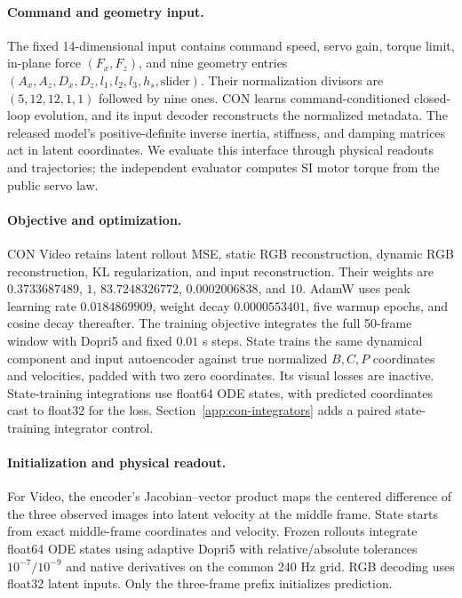 \paragraph{Command and geometry input.}
The fixed 14-dimensional input contains command speed, servo gain, torque limit, in-plane force $(F_x,F_z)$, and nine geometry entries $(A_x,A_z,D_x,D_z,l_1,l_2,l_3,h_s,\mathrm{slider})$. Their normalization divisors are $(5,12,12,1,1)$ followed by nine ones. CON learns command-conditioned closed-loop evolution, and its input decoder reconstructs the normalized metadata. The released model's positive-definite inverse inertia, stiffness, and damping matrices act in latent coordinates. We evaluate this interface through physical readouts and trajectories; the independent evaluator computes SI motor torque from the public servo law.

\paragraph{Objective and optimization.}
CON Video retains latent rollout MSE, static RGB reconstruction, dynamic RGB reconstruction, KL regularization, and input reconstruction. Their weights are $0.3733687489$, $1$, $83.7248326772$, $0.0002006838$, and $10$. AdamW uses peak learning rate $0.0184869909$, weight decay $0.0000553401$, five warmup epochs, and cosine decay thereafter. The training objective integrates the full 50-frame window with Dopri5 and fixed $0.01$ s steps. State trains the same dynamical component and input autoencoder against true normalized $B,C,P$ coordinates and velocities, padded with two zero coordinates. Its visual losses are inactive. State-training integrations use float64 ODE states, with predicted coordinates cast to float32 for the loss. Section~\ref{app:con-integrators} adds a paired state-training integrator control.

\paragraph{Initialization and physical readout.}
For Video, the encoder's Jacobian--vector product maps the centered difference of the three observed images into latent velocity at the middle frame. State starts from exact middle-frame coordinates and velocity. Frozen rollouts integrate float64 ODE states using adaptive Dopri5 with relative/absolute tolerances $10^{-7}/10^{-9}$ and native derivatives on the common 240 Hz grid. RGB decoding uses float32 latent inputs. Only the three-frame prefix initializes prediction.

